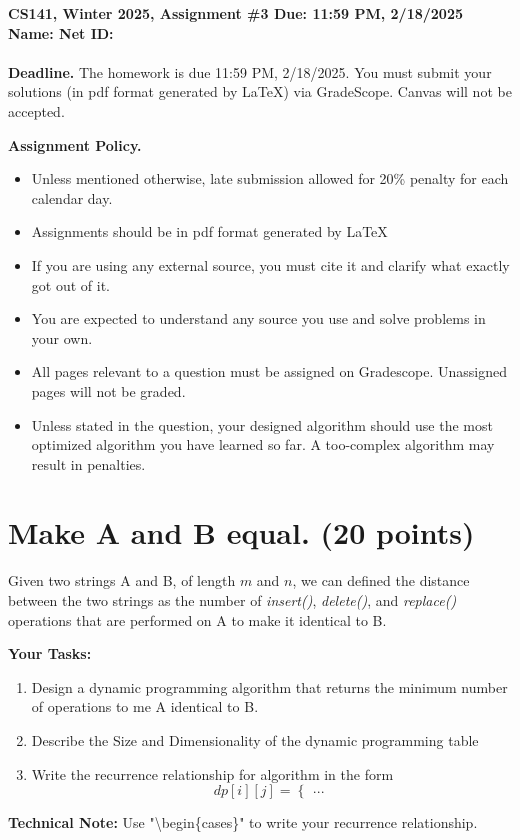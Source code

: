 \documentclass{article}[12pt]
\newcommand{\policy}[1]{#1}
\newcommand{\policy}[1]{}
\newcommand{\deadline}{11:59 PM, 2/18/2025}
\newcommand{\assigntitle}[1]{{
  \noindent \large \bf
  CS141, Winter 2025,
  Assignment \##1 \hfill Due: {\deadline}\\
  Name:  %
  \hspace{2.5in}
  Net ID:  %
  \\
  [-.05in]
  \mbox{}\hrulefill \mbox{}\\}}
\begin{document}
\assigntitle{3}{}
\policy{\textbf{Deadline.} The homework is due 11:59 PM, 2/18/2025. You must submit your solutions (in pdf
format generated by LaTeX) via GradeScope. Canvas will not be accepted.}\\
\date{}
\policy{\textbf{Assignment Policy.}
\begin{itemize}
    \item Unless mentioned otherwise, late submission allowed for 20\% penalty for each calendar day.
    \item Assignments should be in pdf format generated by LaTeX
    \item If you are using any external source, you must cite it and clarify what exactly got out of it.
    \item You are expected to understand any source you use and solve problems in your own.
    \item All pages relevant to a question must be assigned on Gradescope. Unassigned pages will not be graded.
    \item Unless stated in the question, your designed algorithm should use the most optimized algorithm you have learned so far. A too-complex algorithm may result in penalties.
\end{itemize}


}

\section{Make A and B equal. (20 points)}

Given two strings A and B, of length $m$ and $n$, we can defined the distance between the two strings as the number of \textit{insert()}, \textit{delete()}, and \textit{replace()} operations that are performed on A to make it identical to B. 

\noindent\textbf{Your Tasks:}
\begin{enumerate}
    \item Design a dynamic programming algorithm that returns the minimum number of operations to me A identical to B.
    \item Describe the Size and Dimensionality of the dynamic programming table
    \item Write the recurrence relationship for algorithm in the form
    \[
    dp[i][j] = \begin{cases}
        ...
    \end{cases}
    \]
\end{enumerate}
\noindent\textbf{Technical Note:} Use "\textbackslash begin\{cases\}" to write your recurrence relationship.
\end{document}
